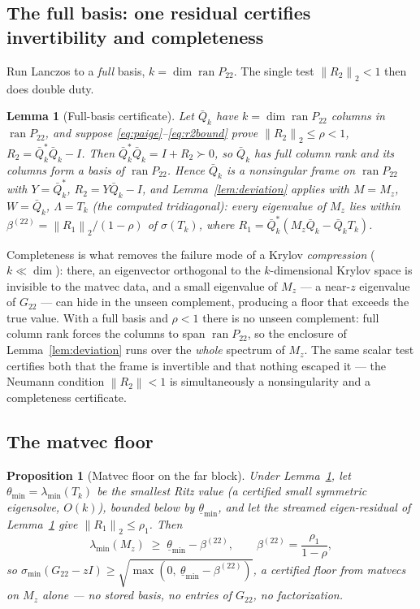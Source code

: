 \documentclass[11pt,a4paper]{article}
\newcommand{\norm}[1]{\left\|#1\right\|}
\newcommand{\spec}{\sigma}
\theoremstyle{plain}
\newtheorem{lemma}[theorem]{Lemma}
\newtheorem{proposition}[theorem]{Proposition}
\theoremstyle{definition}
\begin{document}
\subsection*{The full basis: one residual certifies invertibility and completeness}

Run Lanczos to a \emph{full} basis, $k=\dim\operatorname{ran}P_{22}$. The single test
$\norm{R_2}_2<1$ then does double duty.

\begin{lemma}[Full-basis certificate]\label{lem:fullbasis}
Let $\bar Q_k$ have $k=\dim\operatorname{ran}P_{22}$ columns in $\operatorname{ran}P_{22}$,
and suppose \eqref{eq:paige}--\eqref{eq:r2bound} prove $\norm{R_2}_2\le\rho<1$,
$R_2=\bar Q_k^{*}\bar Q_k-I$. Then $\bar Q_k^{*}\bar Q_k=I+R_2\succ0$, so $\bar Q_k$ has
full column rank and its columns form a basis of $\operatorname{ran}P_{22}$. Hence
$\bar Q_k$ is a nonsingular frame on $\operatorname{ran}P_{22}$ with $Y=\bar Q_k^{*}$,
$R_2=Y\bar Q_k-I$, and Lemma~\ref{lem:deviation} applies with $M=M_z$, $W=\bar Q_k$,
$\Lambda=T_k$ (the computed tridiagonal): every eigenvalue of $M_z$ lies within
$\beta^{(22)}=\norm{R_1}_2/(1-\rho)$ of $\spec(T_k)$, where $R_1=\bar Q_k^{*}(M_z\bar Q_k-\bar Q_kT_k)$.
\end{lemma}

Completeness is what removes the failure mode of a Krylov \emph{compression}
($k\ll\dim$): there, an eigenvector orthogonal to the $k$-dimensional Krylov space is
invisible to the matvec data, and a small eigenvalue of $M_z$ --- a near-$z$ eigenvalue of
$G_{22}$ --- can hide in the unseen complement, producing a floor that exceeds the true
value. With a full basis and $\rho<1$ there is no unseen complement: full column rank forces
the columns to span $\operatorname{ran}P_{22}$, so the enclosure of Lemma~\ref{lem:deviation}
runs over the \emph{whole} spectrum of $M_z$. The same scalar test certifies both that the
frame is invertible and that nothing escaped it --- the Neumann condition $\norm{R_2}<1$ is
simultaneously a nonsingularity and a completeness certificate.

\subsection*{The matvec floor}

\begin{proposition}[Matvec floor on the far block]\label{prop:matfloor}
Under Lemma~\ref{lem:fullbasis}, let $\theta_{\min}=\lambda_{\min}(T_k)$ be the smallest
Ritz value (a certified small symmetric eigensolve, $O(k)$), bounded below by
$\underline\theta_{\min}$, and let the streamed eigen-residual of Lemma~\ref{lem:fullbasis}
give $\norm{R_1}_2\le\rho_1$. Then
\[
  \lambda_{\min}(M_z)\;\ge\;\underline\theta_{\min}-\beta^{(22)},\qquad
  \beta^{(22)}=\frac{\rho_1}{1-\rho},
\]
so $\sigma_{\min}(G_{22}-zI)\ge\sqrt{\max(0,\ \underline\theta_{\min}-\beta^{(22)})}$, a
certified floor from matvecs on $M_z$ alone --- no stored basis, no entries of $G_{22}$, no
factorization.
\end{proposition}
\end{document}
